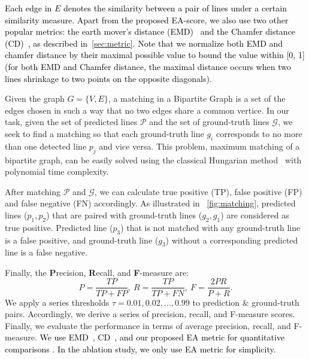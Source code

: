 \documentclass[10pt,journal,cspaper,compsoc]{IEEEtran}
\newcommand{\rerevise}[1]{{\textcolor{black}{#1}}}
\begin{document}
\rerevise{
Each edge in $E$ denotes the similarity between a pair of lines under 
a certain similarity measure.
%
Apart from the proposed EA-score, we also use two other popular metrics:
the earth mover's distance (EMD)~\cite{rubner2000earth} and the Chamfer distance (CD)~\cite{borgefors1986distance}, as described in~\cref{sec:metric}.
%
Note that we normalize both EMD and chamfer distance by their maximal possible
value to bound the value
within [0, 1] (for both EMD and Chamfer distance, the maximal distance occurs when
two lines shrinkage to two points on the opposite diagonals).}

Given the graph $G = \{V, E\}$, a matching in a Bipartite Graph is a set of the edges chosen in such a way that no two edges share
a common vertice.
%
In our task, given the set of predicted lines $\mathcal{P}$ and the set of
ground-truth lines $\mathcal{G}$, we seek to find a matching so that
each ground-truth line $g_i$ corresponds to no more than one detected line $p_j$
and vice versa.
%
This problem, maximum matching of a bipartite graph, can be easily solved using the
classical Hungarian method~\cite{kuhn1955hungarian} with polynomial time complexity.

After matching $\mathcal{P}$ and $\mathcal{G}$, we can calculate true positive
(TP), false positive (FP) and false negative (FN) accordingly.
%
As illustrated in ~\cref{fig:matching}, predicted lines ($p_1, p_2$) that are paired with
ground-truth lines ($g_2, g_1$) are considered as true positive.
%
Predicted line ($p_3$) that is not matched with any ground-truth line is
a false positive,
and ground-truth line ($g_3$) without a corresponding predicted line
is a false negative.

Finally, the \textbf{P}recision, \textbf{R}ecall, and \textbf{F}-measure are:
\begin{equation}
    P = \frac{TP}{TP+FP}, \
    R = \frac{TP}{TP+FN}, \
    F = \frac{2PR}{P + R}.
    \label{eq:pr}
\end{equation}
We apply a series thresholds $\tau = 0.01, 0.02,...,0.99$ to prediction \& ground-truth pairs.
%
Accordingly, we derive a series of precision, recall, and F-measure scores.
%
Finally, we evaluate the performance in terms of average precision, recall, and
F-measure. \rerevise{We use EMD~\cite{rubner2000earth}, CD~\cite{borgefors1986distance}, and our proposed EA metric
for quantitative comparisons .
%
In the ablation study, we only use EA metric for simplicity.}

\end{document}
